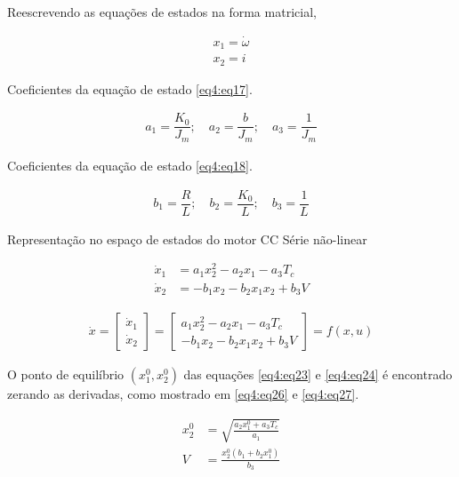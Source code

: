 Reescrevendo as equações de estados na forma matricial,

\begin{align}
    x_1 = \dot{\omega}  \label{eq4:eq19}\\
    x_2 = i   \label{eq4:eq20}
\end{align}


Coeficientes da equação de estado \ref{eq4:eq17}.

\begin{align}
    a_1 = \dfrac{K_0}{J_m}; \quad a_2 = \dfrac{b}{J_m}; \quad a_3 = \dfrac{1}{J_m}  \label{eq4:eq21}
\end{align}

Coeficientes da equação de estado \ref{eq4:eq18}.

\begin{align}
    b_1 = \dfrac{R}{L}; \quad b_2 = \dfrac{K_0}{L}; \quad b_3 = \dfrac{1}{L}  \label{eq4:eq22}
\end{align}

Representação no espaço de estados do motor CC Série não-linear

\begin{align}
    \dot{x}_1 &= a_1x_2^2  - a_2x_1 -a_3T_c   \label{eq4:eq23}\\
    \dot{x}_2 &= -b_1x_2  -b_2x_1x_2 + b_3V    \label{eq4:eq24}
\end{align}



\begin{align}
\dot{x} = \begin{bmatrix}
    \dot{x}_1\\
    \dot{x}_2
\end{bmatrix} = 
\begin{bmatrix}
    a_1x_2^2 -a_2x_1 -a_3T_c \\
    -b_1x_2 -b_2x_1x_2 + b_3V
\end{bmatrix} = f(x, u)  \label{eq4:eq25}
\end{align}

O ponto de equilíbrio $(x_1^0, x_2^0)$ das equações \ref{eq4:eq23} e \ref{eq4:eq24} é encontrado zerando as derivadas, como mostrado em \ref{eq4:eq26} e \ref{eq4:eq27}.


\begin{align}
     x_2^0 &= \sqrt{\frac{a_2x_1^0 + a_3T_c}{a_1}} \label{eq4:eq26}\\
     V &= \frac{x_2^0(b_1+b_2x_1^0)}{b_3} \label{eq4:eq27}
\end{align}



